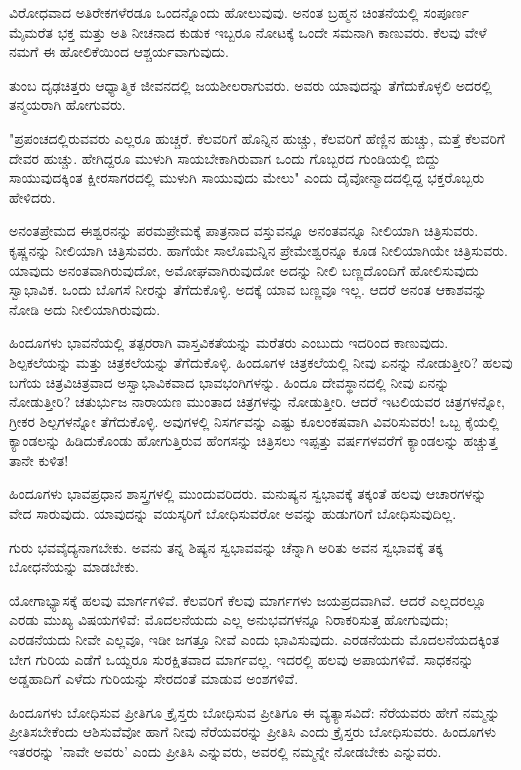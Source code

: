 ವಿರೋಧವಾದ ಅತಿರೇಕಗಳೆರಡೂ ಒಂದನ್ನೊಂದು ಹೋಲುವುವು. ಅನಂತ ಬ್ರಹ್ಮನ ಚಿಂತನೆಯಲ್ಲಿ ಸಂಪೂರ್ಣ ಮೈಮರೆತ ಭಕ್ತ ಮತ್ತು ಅತಿ ನೀಚನಾದ ಕುಡುಕ ಇಬ್ಬರೂ ನೋಟಕ್ಕೆ ಒಂದೇ ಸಮನಾಗಿ ಕಾಣುವರು. ಕೆಲವು ವೇಳೆ ನಮಗೆ ಈ ಹೋಲಿಕೆಯಿಂದ ಆಶ್ಚರ್ಯವಾಗುವುದು.

ತುಂಬ ದೃಢಚಿತ್ತರು ಆಧ್ಯಾತ್ಮಿಕ ಜೀವನದಲ್ಲಿ ಜಯಶೀಲರಾಗುವರು. ಅವರು ಯಾವುದನ್ನು ತೆಗೆದುಕೊಳ್ಳಲಿ ಅದರಲ್ಲಿ ತನ್ಮಯರಾಗಿ ಹೋಗುವರು.

"ಪ್ರಪಂಚದಲ್ಲಿರುವವರು ಎಲ್ಲರೂ ಹುಚ್ಚರೆ. ಕೆಲವರಿಗೆ ಹೊನ್ನಿನ ಹುಚ್ಚು, ಕೆಲವರಿಗೆ ಹೆಣ್ಣಿನ ಹುಚ್ಚು, ಮತ್ತೆ ಕೆಲವರಿಗೆ ದೇವರ ಹುಚ್ಚು. ಹೇಗಿದ್ದರೂ ಮುಳುಗಿ ಸಾಯಬೇಕಾಗಿರುವಾಗ ಒಂದು ಗೊಬ್ಬರದ ಗುಂಡಿಯಲ್ಲಿ ಬಿದ್ದು ಸಾಯುವುದಕ್ಕಿಂತ ಕ್ಷೀರಸಾಗರದಲ್ಲಿ ಮುಳುಗಿ ಸಾಯುವುದು ಮೇಲು" ಎಂದು ದೈವೋನ್ಮಾದದಲ್ಲಿದ್ದ ಭಕ್ತರೊಬ್ಬರು ಹೇಳಿದರು.

ಅನಂತಪ್ರೇಮದ ಈಶ್ವರನನ್ನು ಪರಮಪ್ರೇಮಕ್ಕೆ ಪಾತ್ರನಾದ ವಸ್ತುವನ್ನೂ ಅನಂತವನ್ನೂ ನೀಲಿಯಾಗಿ ಚಿತ್ರಿಸುವರು. ಕೃಷ್ಣನನ್ನು ನೀಲಿಯಾಗಿ ಚಿತ್ರಿಸುವರು. ಹಾಗೆಯೇ ಸಾಲೊಮನ್ನಿನ ಪ್ರೇಮೇಶ್ವರನ್ನೂ ಕೂಡ ನೀಲಿಯಾಗಿಯೇ ಚಿತ್ರಿಸುವರು. ಯಾವುದು ಅನಂತವಾಗಿರುವುದೋ, ಅಮೋಘವಾಗಿರುವುದೋ ಅದನ್ನು ನೀಲಿ ಬಣ್ಣದೊಂದಿಗೆ ಹೋಲಿಸುವುದು ಸ್ವಾಭಾವಿಕ. ಒಂದು ಬೊಗಸೆ ನೀರನ್ನು ತೆಗೆದುಕೊಳ್ಳಿ. ಅದಕ್ಕೆ ಯಾವ ಬಣ್ಣವೂ ಇಲ್ಲ. ಆದರೆ ಅನಂತ ಆಕಾಶವನ್ನು ನೋಡಿ ಅದು ನೀಲಿಯಾಗಿರುವುದು.

ಹಿಂದೂಗಳು ಭಾವನೆಯಲ್ಲಿ ತತ್ಪರರಾಗಿ ವಾಸ್ತವಿಕತೆಯನ್ನು ಮರೆತರು ಎಂಬುದು ಇದರಿಂದ ಕಾಣುವುದು. ಶಿಲ್ಪಕಲೆಯನ್ನು ಮತ್ತು ಚಿತ್ರಕಲೆಯನ್ನು ತೆಗೆದುಕೊಳ್ಳಿ. ಹಿಂದೂಗಳ ಚಿತ್ರಕಲೆಯಲ್ಲಿ ನೀವು ಏನನ್ನು ನೋಡುತ್ತೀರಿ? ಹಲವು ಬಗೆಯ ಚಿತ್ರವಿಚಿತ್ರವಾದ ಅಸ್ವಾಭಾವಿಕವಾದ ಭಾವಭಂಗಿಗಳನ್ನು. ಹಿಂದೂ ದೇವಸ್ಥಾನದಲ್ಲಿ ನೀವು ಏನನ್ನು ನೋಡುತ್ತೀರಿ? ಚತುರ್ಭುಜ ನಾರಾಯಣ ಮುಂತಾದ ಚಿತ್ರಗಳನ್ನು ನೋಡುತ್ತೀರಿ. ಆದರೆ ಇಟಲಿಯವರ ಚಿತ್ರಗಳನ್ನೋ, ಗ್ರೀಕರ ಶಿಲ್ಪಗಳನ್ನೋ ತೆಗೆದುಕೊಳ್ಳಿ. ಅವುಗಳಲ್ಲಿ ನಿಸರ್ಗವನ್ನು ಎಷ್ಟು ಕೂಲಂಕಷವಾಗಿ ವಿವರಿಸುವರು! ಒಬ್ಬ ಕೈಯಲ್ಲಿ ಕ್ಯಾಂಡಲನ್ನು ಹಿಡಿದುಕೊಂಡು ಹೋಗುತ್ತಿರುವ ಹೆಂಗಸನ್ನು ಚಿತ್ರಿಸಲು ಇಪ್ಪತ್ತು ವರ್ಷಗಳವರೆಗೆ ಕ್ಯಾಂಡಲನ್ನು ಹಚ್ಚುತ್ತ ತಾನೇ ಕುಳಿತ!

ಹಿಂದೂಗಳು ಭಾವಪ್ರಧಾನ ಶಾಸ್ತ್ರಗಳಲ್ಲಿ ಮುಂದುವರಿದರು. ಮನುಷ್ಯನ ಸ್ವಭಾವಕ್ಕೆ ತಕ್ಕಂತೆ ಹಲವು ಆಚಾರಗಳನ್ನು ವೇದ ಸಾರುವುದು. ಯಾವುದನ್ನು ವಯಸ್ಕರಿಗೆ ಬೋಧಿಸುವರೋ ಅವನ್ನು ಹುಡುಗರಿಗೆ ಬೋಧಿಸುವುದಿಲ್ಲ.

ಗುರು ಭವವೈದ್ಯನಾಗಬೇಕು. ಅವನು ತನ್ನ ಶಿಷ್ಯನ ಸ್ವಭಾವವನ್ನು ಚೆನ್ನಾಗಿ ಅರಿತು ಅವನ ಸ್ವಭಾವಕ್ಕೆ ತಕ್ಕ ಬೋಧನೆಯನ್ನು ಮಾಡಬೇಕು.

ಯೋಗಾಭ್ಯಾಸಕ್ಕೆ ಹಲವು ಮಾರ್ಗಗಳಿವೆ. ಕೆಲವರಿಗೆ ಕೆಲವು ಮಾರ್ಗಗಳು ಜಯಪ್ರದವಾಗಿವೆ. ಆದರೆ ಎಲ್ಲದರಲ್ಲೂ ಎರಡು ಮುಖ್ಯ ವಿಷಯಗಳಿವೆ: ಮೊದಲನೆಯದು ಎಲ್ಲ ಅನುಭವಗಳನ್ನೂ ನಿರಾಕರಿಸುತ್ತ ಹೋಗುವುದು; ಎರಡನೆಯದು ನೀವೇ ಎಲ್ಲವೂ, ಇಡೀ ಜಗತ್ತೂ ನೀವೆ ಎಂದು ಭಾವಿಸುವುದು. ಎರಡನೆಯದು ಮೊದಲನೆಯದಕ್ಕಿಂತ ಬೇಗ ಗುರಿಯ ಎಡೆಗೆ ಒಯ್ದರೂ ಸುರಕ್ಷಿತವಾದ ಮಾರ್ಗವಲ್ಲ. ಇದರಲ್ಲಿ ಹಲವು ಅಪಾಯಗಳಿವೆ. ಸಾಧಕನನ್ನು ಅಡ್ಡಹಾದಿಗೆ ಎಳೆದು ಗುರಿಯನ್ನು ಸೇರದಂತೆ ಮಾಡುವ ಅಂಶಗಳಿವೆ.

ಹಿಂದೂಗಳು ಬೋಧಿಸುವ ಪ್ರೀತಿಗೂ ಕ್ರೈಸ್ತರು ಬೋಧಿಸುವ ಪ್ರೀತಿಗೂ ಈ ವ್ಯತ್ಯಾಸವಿದೆ: ನೆರೆಯವರು ಹೇಗೆ ನಮ್ಮನ್ನು ಪ್ರೀತಿಸಬೇಕೆಂದು ಆಶಿಸುವೆವೋ ಹಾಗೆ ನೀವು ನೆರೆಯವರನ್ನು ಪ್ರೀತಿಸಿ ಎಂದು ಕ್ರೈಸ್ತರು ಬೋಧಿಸುವರು. ಹಿಂದೂಗಳು ಇತರರನ್ನು 'ನಾವೇ ಅವರು' ಎಂದು ಪ್ರೀತಿಸಿ ಎನ್ನುವರು, ಅವರಲ್ಲಿ ನಮ್ಮನ್ನೇ ನೋಡಬೇಕು ಎನ್ನುವರು.

